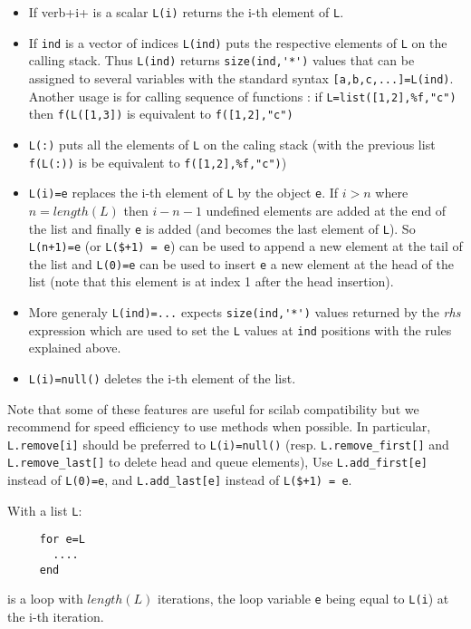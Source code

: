 \begin{itemize}
   \item If verb+i+ is a scalar \verb+L(i)+ returns the i-th element of \verb+L+.
   \item If \verb+ind+ is a vector of indices \verb+L(ind)+ 
     puts the respective elements of \verb+L+ on the 
     calling stack. Thus \verb+L(ind)+ returns \verb+size(ind,'*')+ values that 
     can be assigned to several variables with the standard syntax \verb+[a,b,c,...]=L(ind)+. 
     Another usage is for calling sequence of functions : if \verb+L=list([1,2],%f,"c")+
     then  \verb+f(L([1,3])+ is equivalent to  \verb+f([1,2],"c")+
   \item \verb+L(:)+ puts all the elements of \verb+L+ on the caling stack
     (with the previous list  \verb+f(L(:))+ is be equivalent to \verb+f([1,2],%f,"c")+)
   \item \verb+L(i)=e+ replaces the i-th element of \verb+L+ by
     the object \verb+e+. If $i > n$ where $n=length(L)$ then $i-n-1$ undefined
     elements are added at the end of the list and finally \verb+e+
     is added (and becomes the last element of \verb+L+). 
     So \verb-L(n+1)=e- (or \verb-L($+1) = e-) can be used to append a new element at the tail of the list 
     and \verb+L(0)=e+ can be used to insert \verb+e+ a new element at the head of the list 
     (note that this element is at index 1 after the head insertion).
   \item More generaly \verb+L(ind)=...+ expects \verb+size(ind,'*')+ values returned 
     by the {\em rhs} expression which are used to set the \verb+L+ values at \verb+ind+ positions with 
     the rules explained above. 
   \item \verb+L(i)=null()+ deletes the i-th element of the list.
\end{itemize}

Note that some of these features are useful for scilab compatibility
but we recommend for speed efficiency to use methods when possible.
In particular, \verb+L.remove[i]+ should be preferred to \verb+L(i)=null()+ 
(resp. \verb+L.remove_first[]+ and \verb+L.remove_last[]+ to delete head and queue elements),
Use \verb+L.add_first[e]+ instead of \verb+L(0)=e+, and \verb+L.add_last[e]+ instead of 
\verb-L($+1) = e-.

With a list \verb+L+:\begin{verbatim}
     for e=L
       ....
     end
\end{verbatim} 
is a loop with $length(L)$ iterations, the loop 
variable  \verb+e+ being equal to \verb+L(i+) at the i-th iteration.

